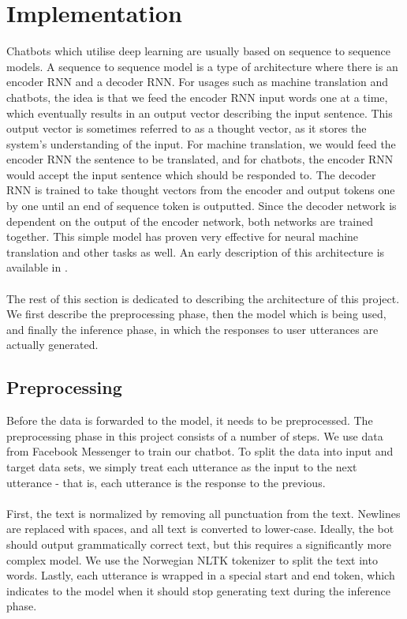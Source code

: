 \documentclass{article}
\begin{document}
\section*{Implementation}
Chatbots which utilise deep learning are usually based on sequence to sequence
models. A sequence to sequence model is a type of architecture where there is
an encoder RNN and a decoder RNN. For usages such as machine translation and
chatbots, the idea is that we feed the encoder RNN input words one at a time,
which eventually results in an output vector describing the input sentence.
This output vector is sometimes referred to as a thought vector, as it stores
the system's understanding of the input. For machine translation, we would feed
the encoder RNN the sentence to be translated, and for chatbots, the encoder
RNN would accept the input sentence which should be responded to. The decoder
RNN is trained to take thought vectors from the encoder and output tokens
one by one until an end of sequence token is outputted. Since the decoder
network is dependent on the output of the encoder network, both networks are
trained together. This simple model has proven very effective for neural
machine translation and other tasks as well. An early description of this
architecture is available in \cite{Cho2014}.

\paragraph{}
The rest of this section is dedicated to describing the architecture of
this project. We first describe the preprocessing phase, then the model which
is being used, and finally the inference phase, in which the responses to user
utterances are actually generated.

\subsection*{Preprocessing}
Before the data is forwarded to the model, it needs to be preprocessed. The
preprocessing phase in this project consists of a number of steps. We use
data from Facebook Messenger to train our chatbot. To split the data into
input and target data sets, we simply treat each utterance as the input to
the next utterance - that is, each utterance is the response to the previous.

\paragraph{}
First, the text is normalized by removing all punctuation from the text. Newlines
are replaced with spaces, and all text is converted to lower-case. Ideally,
the bot should output grammatically correct text, but this requires a
significantly more complex model. We use the Norwegian NLTK tokenizer to split
the text into words. Lastly, each utterance is wrapped in a special start and
end token, which indicates to the model when it should stop generating text
during the inference phase.
\end{document}
